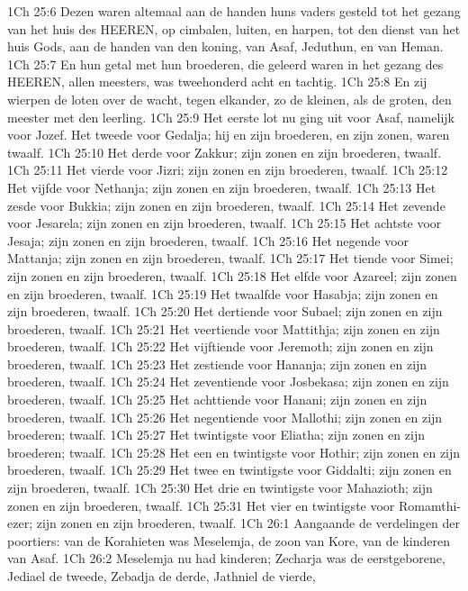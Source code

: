 1Ch 25:6  Dezen waren altemaal aan de handen huns vaders gesteld tot het gezang van het huis des HEEREN, op cimbalen, luiten, en harpen, tot den dienst van het huis Gods, aan de handen van den koning, van Asaf, Jeduthun, en van Heman.
1Ch 25:7  En hun getal met hun broederen, die geleerd waren in het gezang des HEEREN, allen meesters, was tweehonderd acht en tachtig.
1Ch 25:8  En zij wierpen de loten over de wacht, tegen elkander, zo de kleinen, als de groten, den meester met den leerling.
1Ch 25:9  Het eerste lot nu ging uit voor Asaf, namelijk voor Jozef. Het tweede voor Gedalja; hij en zijn broederen, en zijn zonen, waren twaalf.
1Ch 25:10  Het derde voor Zakkur; zijn zonen en zijn broederen, twaalf.
1Ch 25:11  Het vierde voor Jizri; zijn zonen en zijn broederen, twaalf.
1Ch 25:12  Het vijfde voor Nethanja; zijn zonen en zijn broederen, twaalf.
1Ch 25:13  Het zesde voor Bukkia; zijn zonen en zijn broederen, twaalf.
1Ch 25:14  Het zevende voor Jesarela; zijn zonen en zijn broederen, twaalf.
1Ch 25:15  Het achtste voor Jesaja; zijn zonen en zijn broederen, twaalf.
1Ch 25:16  Het negende voor Mattanja; zijn zonen en zijn broederen, twaalf.
1Ch 25:17  Het tiende voor Simei; zijn zonen en zijn broederen, twaalf.
1Ch 25:18  Het elfde voor Azareel; zijn zonen en zijn broederen, twaalf.
1Ch 25:19  Het twaalfde voor Hasabja; zijn zonen en zijn broederen, twaalf.
1Ch 25:20  Het dertiende voor Subael; zijn zonen en zijn broederen, twaalf.
1Ch 25:21  Het veertiende voor Mattithja; zijn zonen en zijn broederen, twaalf.
1Ch 25:22  Het vijftiende voor Jeremoth; zijn zonen en zijn broederen, twaalf.
1Ch 25:23  Het zestiende voor Hananja; zijn zonen en zijn broederen, twaalf.
1Ch 25:24  Het zeventiende voor Josbekasa; zijn zonen en zijn broederen, twaalf.
1Ch 25:25  Het achttiende voor Hanani; zijn zonen en zijn broederen, twaalf.
1Ch 25:26  Het negentiende voor Mallothi; zijn zonen en zijn broederen; twaalf.
1Ch 25:27  Het twintigste voor Eliatha; zijn zonen en zijn broederen; twaalf.
1Ch 25:28  Het een en twintigste voor Hothir; zijn zonen en zijn broederen, twaalf.
1Ch 25:29  Het twee en twintigste voor Giddalti; zijn zonen en zijn broederen, twaalf.
1Ch 25:30  Het drie en twintigste voor Mahazioth; zijn zonen en zijn broederen, twaalf.
1Ch 25:31  Het vier en twintigste voor Romamthi-ezer; zijn zonen en zijn broederen, twaalf.
1Ch 26:1  Aangaande de verdelingen der poortiers: van de Korahieten was Meselemja, de zoon van Kore, van de kinderen van Asaf.
1Ch 26:2  Meselemja nu had kinderen; Zecharja was de eerstgeborene, Jediael de tweede, Zebadja de derde, Jathniel de vierde,
